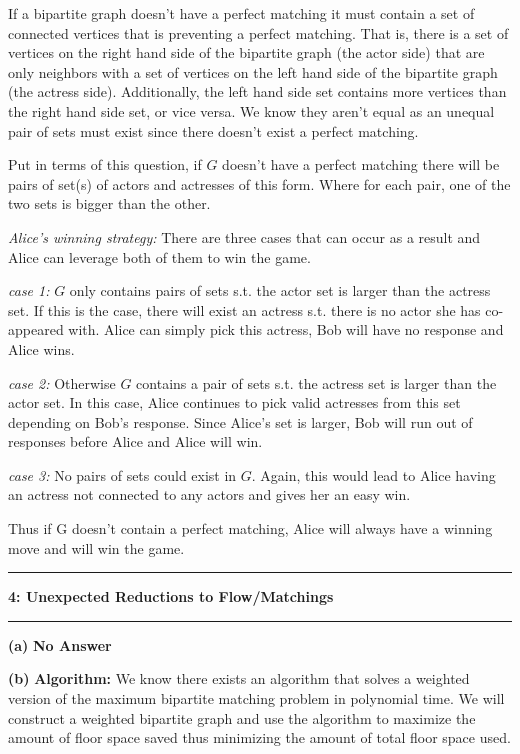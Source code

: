 \documentclass[11pt]{article}
\newcommand\question[2]{\vspace{.25in}\hrule\textbf{#1: #2}\vspace{.5em}\hrule\vspace{.10in}}
\renewcommand\part[1]{\vspace{.10in}\textbf{(#1)}}
\newcommand\algorith{\vspace{.10in}\textbf{Algorithm: }}
\begin{document}
 If a bipartite graph doesn't have a perfect matching it must contain a set of connected vertices that is preventing a perfect matching. That is, there is a set of vertices on the right hand side of the bipartite graph (the actor side) that are only neighbors with a set of vertices on the left hand side of the bipartite graph (the actress side). Additionally, the left hand side set contains more vertices than the right hand side set, or vice versa. We know they aren't equal as an unequal pair of sets must exist since there doesn't exist a perfect matching.
 
 	Put in terms of this question, if $G$ doesn't have a perfect matching there will be pairs of set(s) of actors and actresses of this form. Where for each pair, one of the two sets is bigger than the other.

\textit{Alice's winning strategy:} There are three cases that can occur as a result and Alice can leverage both of them to win the game.

\textit{case 1:} $G$ only contains pairs of sets s.t. the actor set is larger than the actress set. If this is the case, there will exist an actress s.t. there is no actor she has co-appeared with. Alice can simply pick this actress, Bob will have no response and Alice wins.

\textit{case 2:} Otherwise $G$ contains a pair of sets s.t. the actress set is larger than the actor set. In this case, Alice continues to pick valid actresses from this set depending on Bob's response. Since Alice's set is larger, Bob will run out of responses before Alice and Alice will win.

\textit{case 3:} No pairs of sets could exist in $G$. Again, this would lead to Alice having an actress not connected to any actors and gives her an easy win.

Thus if G doesn't contain a perfect matching, Alice will always have a winning move and will win the game.

\question{4}{Unexpected Reductions to Flow/Matchings}

\part{a} \textbf{No Answer}

\part{b} \algorith We know there exists an algorithm that solves a weighted version of the maximum bipartite matching problem in polynomial time. We will construct a weighted bipartite graph and use the algorithm to maximize the amount of floor space saved thus minimizing the amount of total floor space used.
\end{document}
